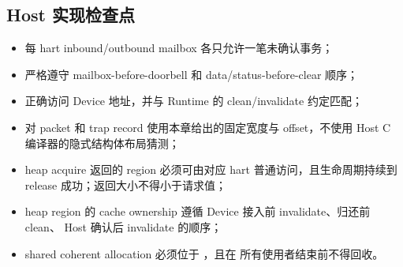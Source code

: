 \documentclass[../dayan_kernel_manual.tex]{subfiles}
\begin{document}
\subsection{Host 实现检查点}

\begin{itemize}
  \item 每 hart inbound/outbound mailbox 各只允许一笔未确认事务；
  \item 严格遵守 mailbox-before-doorbell 和 data/status-before-clear 顺序；
  \item 正确访问 Device 地址，并与 Runtime 的 clean/invalidate 约定匹配；
  \item 对 packet 和 trap record 使用本章给出的固定宽度与 offset，不使用 Host C
        编译器的隐式结构体布局猜测；
  \item heap acquire 返回的 region 必须可由对应 hart 普通访问，且生命周期持续到
        release 成功；返回大小不得小于请求值；
  \item heap region 的 cache ownership 遵循 Device 接入前 invalidate、归还前 clean、
        Host 确认后 invalidate 的顺序；
  \item shared coherent allocation 必须位于 ，且在
        所有使用者结束前不得回收。
\end{itemize}
\end{document}
